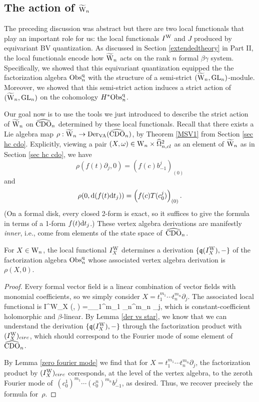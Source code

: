 \subsection{The action of $\widetilde{{{\rm W}}}_n$}

The preceding discussion was abstract but there are two local functionals that play an important role for us:
the local functionals $I^{{\rm W}}$ and $J$ produced by equivariant BV quantization.
As discussed in Section \ref{extendedtheory} in Part II, the local functionals encode how $\widetilde{{{\rm W}}}_n$ acts on 
the rank $n$ formal $\beta\gamma$ system.
Specifically, we showed that this equivariant quantization equipped the the factorization algebra
${\rm Obs}^{{\rm q}}_n$ with the structure of a semi-strict $(\widetilde{{{\rm W}}}_n,{\rm GL}_n)$-module. 
Moreover, we showed that this semi-strict action induces a strict action of $(\widetilde{{{\rm W}}}_n,{\rm GL}_n)$ on the cohomology $H^*{\rm Obs}^{{\rm q}}_n$.

Our goal now is to use the tools we just introduced to describe the strict action of $\widetilde{{{\rm W}}}_n$ on $\widehat{\rm CDO}_n$
determined by these local functionals. 
Recall that there exists a Lie algebra map $\rho : \widetilde{{{\rm W}}}_n \to {\rm Der}_{{\rm VA}}(\widehat{\rm CDO}_n)$,
by Theorem \ref{MSV1} from Section \ref{sec hc cdo}.
Explicitly, viewing a pair $(X, \omega) \in {{\rm W}_n} \times \widehat{\Omega}^2_{n,cl}$ as an element of $\widetilde{{{\rm W}}}_n$
as in Section \ref{sec hc cdo}, 
we have
\[
\rho(f(t) \partial_j,0) = (f(c) b_{-1}^j)_{(0)}
\]
and
\[
\rho(0, {\rm d}(f(t) {\rm d} t_j)) = \left(f(c) T (c_0^{j})\right)_{(0)}.
\]
(On a formal disk, every closed 2-form is exact, so it suffices to give the formula in terms of a 1-form $f(t) {\rm d} t_j$.)
These vertex algebra derivations are manifestly \emph{inner}, i.e., come from elements of the state space of~$\widehat{\rm CDO}_n$.

\begin{lemma}
For $X \in {{\rm W}_n}$, the local functional $I_X^{\rm W}$ determines 
a derivation $\{\frak{q}(I_X^{\rm W}),-\}$ of the factorization algebra ${\rm Obs}^{\rm q}_n$ 
whose associated vertex algebra derivation is~$\rho(X,0)$.
\end{lemma}

\begin{proof}
Every formal vector field is a linear combination of vector fields with monomial coefficients,
so we simply consider  $X = t^{m_1}_1 \cdots t^{m_n}_n \partial_j$.
The associated local functional is
\ben
I^{\rm W}_X (\gamma, \beta) =\int_\CC\gamma_1^{m_1} \wedge \cdots \wedge \gamma_n^{m_n} \wedge \beta_j,
\een 
which is constant-coefficient holomorphic and $\beta$-linear.
By Lemma \ref{der vs star}, we know that we can understand the derivation $\{\frak{q}(I^{\rm W}_X),-\}$ 
through the factorization product with $(I^{\rm W}_X)_{circ}$, 
which should correspond to the Fourier mode of some element of~$\widehat{\rm CDO}_n$.

By Lemma \ref{zero fourier mode} we find that for $X = t^{m_1}_1 \cdots t^{m_n}_n \partial_j$,
the factorization product by $(I^{\rm W}_X)_{circ}$ corresponds, at the level of the vertex algebra, to the zeroth Fourier mode of~$(c^1_0)^{m_1} \cdots (c^n_0)^{m_n} b^j_{-1}$, as desired. Thus, we recover precisely the formula for~$\rho$.
\end{proof}

